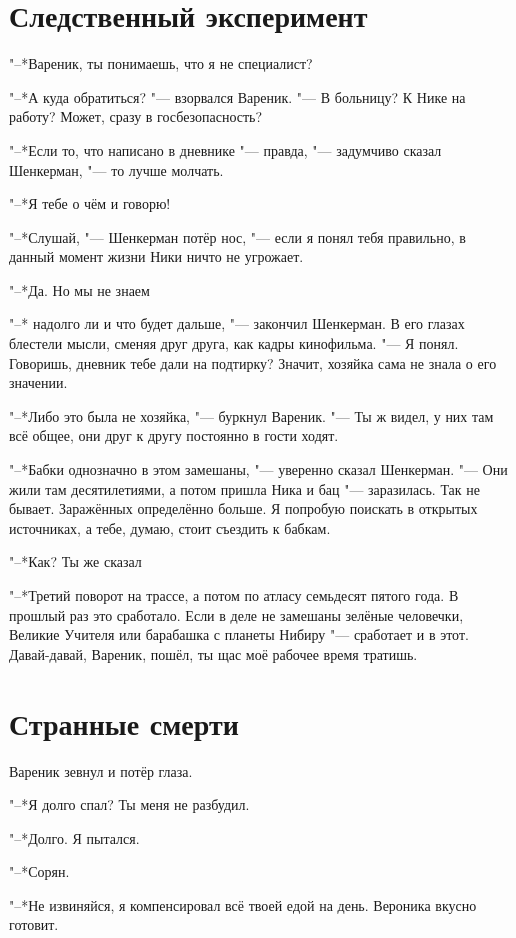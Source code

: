 \section{Следственный эксперимент}

"--*Вареник, ты понимаешь, что я не специалист?

"--*А куда обратиться? "--- взорвался Вареник.
"--- В больницу?
К Нике на работу?
Может, сразу в госбезопасность?

"--*Если то, что написано в дневнике "--- правда, "--- задумчиво сказал Шенкерман, "--- то лучше молчать.

"--*Я тебе о чём и говорю!

"--*Слушай, "--- Шенкерман потёр нос, "--- если я понял тебя правильно, в данный момент жизни Ники ничто не угрожает.

"--*Да.
Но мы не знаем\ldotst

"--* \ldotst надолго ли и что будет дальше, "--- закончил Шенкерман.
В его глазах блестели мысли, сменяя друг друга, как кадры кинофильма.
"--- Я понял.
Говоришь, дневник тебе дали на подтирку?
Значит, хозяйка сама не знала о его значении.

"--*Либо это была не хозяйка, "--- буркнул Вареник.
"--- Ты ж видел, у них там всё общее, они друг к другу постоянно в гости ходят.

"--*Бабки однозначно в этом замешаны, "--- уверенно сказал Шенкерман.
"--- Они жили там десятилетиями, а потом пришла Ника и бац "--- заразилась.
Так не бывает.
Заражённых определённо больше.
Я попробую поискать в открытых источниках, а тебе, думаю, стоит съездить к бабкам.

"--*Как?
Ты же сказал\ldotst

"--*Третий поворот на трассе, а потом по атласу семьдесят пятого года.
В прошлый раз это сработало.
Если в деле не замешаны зелёные человечки, Великие Учителя или барабашка с планеты Нибиру "--- сработает и в этот.
Давай-давай, Вареник, пошёл, ты щас моё рабочее время тратишь.

\section{Странные смерти}

Вареник зевнул и потёр глаза.

"--*Я долго спал?
Ты меня не разбудил.

"--*Долго.
Я пытался.

"--*Сорян.

"--*Не извиняйся, я компенсировал всё твоей едой на день.
Вероника вкусно готовит.

